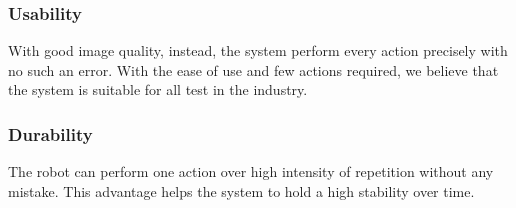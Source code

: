 \subsubsection{Usability}
With good image quality, instead, the system perform every action precisely with no such an error. With the ease of use and few actions required, we believe that the system is suitable for all test in the industry.

\subsubsection{Durability}
The robot can perform one action over high intensity of repetition without any mistake. This advantage helps the system to hold a high stability over time.